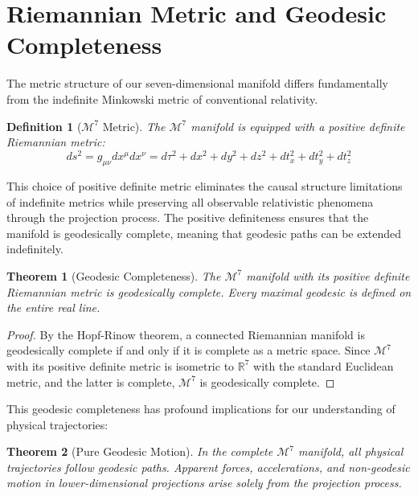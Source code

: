 \documentclass{article}
\newtheorem{definition}{Definition}
\newtheorem{theorem}{Theorem}
\begin{document}
\section{Riemannian Metric and Geodesic Completeness}

The metric structure of our seven-dimensional manifold differs fundamentally from the indefinite Minkowski metric of conventional relativity.

\begin{definition}[$\mathcal{M}^7$ Metric]
The $\mathcal{M}^7$ manifold is equipped with a positive definite Riemannian metric:
\begin{equation}
ds^2 = g_{\mu\nu}dx^\mu dx^\nu = d\tau^2 + dx^2 + dy^2 + dz^2 + dt_x^2 + dt_y^2 + dt_z^2
\end{equation}
\end{definition}

This choice of positive definite metric eliminates the causal structure limitations of indefinite metrics while preserving all observable relativistic phenomena through the projection process. The positive definiteness ensures that the manifold is geodesically complete, meaning that geodesic paths can be extended indefinitely.

\begin{theorem}[Geodesic Completeness]
The $\mathcal{M}^7$ manifold with its positive definite Riemannian metric is geodesically complete. Every maximal geodesic is defined on the entire real line.
\end{theorem}

\begin{proof}
By the Hopf-Rinow theorem, a connected Riemannian manifold is geodesically complete if and only if it is complete as a metric space. Since $\mathcal{M}^7$ with its positive definite metric is isometric to $\mathbb{R}^7$ with the standard Euclidean metric, and the latter is complete, $\mathcal{M}^7$ is geodesically complete.
\end{proof}

This geodesic completeness has profound implications for our understanding of physical trajectories:

\begin{theorem}[Pure Geodesic Motion]
In the complete $\mathcal{M}^7$ manifold, all physical trajectories follow geodesic paths. Apparent forces, accelerations, and non-geodesic motion in lower-dimensional projections arise solely from the projection process.
\end{theorem}
\end{document}
